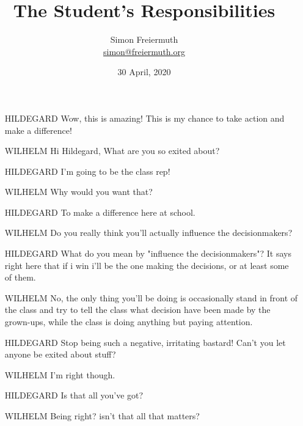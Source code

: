 \documentclass[12pt, letterpaper, twoside]{article}
\title{The Student's Responsibilities}
\author{Simon Freiermuth \\ \href{mailto:simon@freiermuth.org}{simon@freiermuth.org}}
\date{30 April, 2020}
\begin{document}
\maketitle

\begin{flushleft}

\begin{itemize}
    \item[HILDEGARD]	Wow, this is amazing! This is my chance to take action and make a difference!

    \item[WILHELM] 	Hi Hildegard, What are you so exited about?

    \item[HILDEGARD]	I'm going to be the class rep!

    \item[WILHELM] 	Why would you want that?

    \item[HILDEGARD]	To make a difference here at school.

    \item[WILHELM] 	Do you really think you'll actually influence the decisionmakers?

    \item[HILDEGARD]	What do you mean by "influence the decisionmakers"? It says right here that if i
			win i'll be the one making the decisions, or at least some of them.

    \item[WILHELM]	No, the only thing you'll be doing is occasionally stand in front of the class and
			try to tell the class what decision have been made by the grown-ups, while the class
			is doing anything but paying attention.

    \item[HILDEGARD]	Stop being such a negative, irritating bastard! Can't you let anyone be exited about stuff?

    \item[WILHELM]	I'm right though.

    \item[HILDEGARD]	Is that all you've got?

    \item[WILHELM]	Being right? isn't that all that matters?


\end{itemize}
\end{flushleft}
\end{document}
